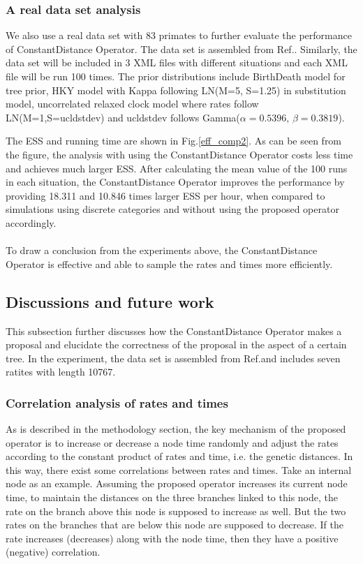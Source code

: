 \documentclass{bmcart}
\begin{document}
\subsubsection*{A real data set analysis}
We also use a real data set with 83 primates to further evaluate the performance of ConstantDistance Operator. The data set is assembled from Ref.\cite{finstermeier2013mitogenomic}. Similarly, the data set will be included in 3 XML files with different situations and each XML file will be run 100 times. The prior distributions include BirthDeath model for tree prior, HKY model with Kappa following LN(M=5, S=1.25) in substitution model, uncorrelated relaxed clock model where rates follow LN(M=1,S=ucldstdev) and ucldstdev follows Gamma($\alpha = 0.5396$, $\beta = 0.3819$). 

The ESS and running time are shown in Fig.\ref{eff_comp2}. As can be seen from the figure, the analysis with using the ConstantDistance Operator costs less time and achieves much larger ESS. After calculating the mean value of the 100 runs in each situation, the ConstantDistance Operator improves the performance by providing 18.311 and 10.846 times larger ESS per hour, when compared to simulations using discrete categories and without using the proposed operator accordingly. 
\\
\\
To draw a conclusion from the experiments above, the ConstantDistance Operator is effective and able to sample the rates and times more efficiently. 
\subsection*{Discussions and future work}
This subsection further discusses how the ConstantDistance Operator makes a proposal and elucidate the correctness of the proposal in the aspect of a certain tree. In the experiment, the data set is assembled from Ref.\cite{cooper2001complete}and includes seven ratites with length 10767. 
\subsubsection*{Correlation analysis of rates and times}
As is described in the methodology section, the key mechanism of the proposed operator is to increase or decrease a node time randomly and adjust the rates according to the constant product of rates and time, i.e. the genetic distances. In this way, there exist some correlations between rates and times. Take an internal node as an example. Assuming the proposed operator increases its current node time, to maintain the distances on the three branches linked to this node, the rate on the branch above this node is supposed to increase as well. But the two rates on the branches that are below this node are supposed to decrease. If the rate increases (decreases) along with the node time, then they have a positive (negative) correlation. 
\end{document}
